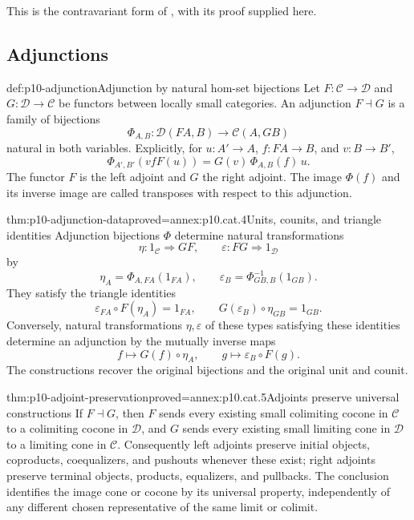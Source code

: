 This is the contravariant form of
\cite[Theorem~2.2.4, pp.~61--63; Exercise~2.2.i,
p.~66]{Riehl2026ContextOnline}, with its proof supplied here.

\subsection{Adjunctions}

\begin{hbdefinition}{def:p10-adjunction}{Adjunction by natural hom-set bijections}
Let \(F:\mathcal C\to\mathcal D\) and \(G:\mathcal D\to\mathcal C\)
be functors between locally small categories.
An adjunction \(F\dashv G\) is a family of bijections
\[
 \Phi_{A,B}:\mathcal D(F A,B)\longrightarrow\mathcal C(A,G B)
\]
natural in both variables.  Explicitly, for
\(u:A'\to A\), \(f:F A\to B\), and \(v:B\to B'\),
\[
 \Phi_{A',B'}(v f F(u))=G(v)\,\Phi_{A,B}(f)\,u.
\]
The functor \(F\) is the left adjoint and \(G\) the right adjoint.
The image \(\Phi(f)\) and its inverse image are called
transposes with respect to this adjunction.
\end{hbdefinition}

\begin{hbtheorem}{thm:p10-adjunction-data}{proved=annex:p10.cat.4}{Units, counits, and triangle identities}
Adjunction bijections \(\Phi\) determine natural transformations
\[
 \eta:1_{\mathcal C}\Rightarrow GF,\qquad
 \varepsilon:FG\Rightarrow1_{\mathcal D}
\]
by
\[
 \eta_A=\Phi_{A,F A}(1_{F A}),\qquad
 \varepsilon_B=\Phi^{-1}_{G B,B}(1_{G B}).
\]
They satisfy the triangle identities
\[
 \varepsilon_{F A}\circ F(\eta_A)=1_{F A},\qquad
 G(\varepsilon_B)\circ\eta_{G B}=1_{G B}.
\]
Conversely, natural transformations \(\eta,\varepsilon\) of these
types satisfying these identities determine an adjunction by the
mutually inverse maps
\[
 f\longmapsto G(f)\circ\eta_A,\qquad
 g\longmapsto\varepsilon_B\circ F(g).
\]
The constructions recover the original bijections and the original
unit and counit.
\end{hbtheorem}

\begin{hbtheorem}{thm:p10-adjoint-preservation}{proved=annex:p10.cat.5}{Adjoints preserve universal constructions}
If \(F\dashv G\), then \(F\) sends every existing small colimiting
cocone in \(\mathcal C\) to a colimiting cocone in \(\mathcal D\),
and \(G\) sends every existing small limiting cone in
\(\mathcal D\) to a limiting cone in \(\mathcal C\).
Consequently left adjoints preserve initial objects, coproducts,
coequalizers, and pushouts whenever these exist; right adjoints
preserve terminal objects, products, equalizers, and pullbacks.
The conclusion identifies the image cone or cocone by its
universal property, independently of any different chosen
representative of the same limit or colimit.
\end{hbtheorem}

